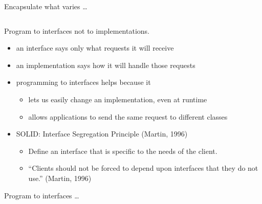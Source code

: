 \documentclass{beamer}
\begin{document}
\begin{frame}{Encapsulate what varies \ldots}
    \begin{columns}
        \column{\dimexpr\paperwidth-40pt}
        
    \end{columns}
\end{frame}

\begin{frame}{Program to interfaces not to implementations.}
    \begin{itemize}
        \item an interface says only what requests it will receive
        \item an implementation says how it will handle those requests
        \item programming to interfaces helps because it
            \begin{itemize}
                \item lets us easily change an implementation, even at runtime
                \item allows applications to send the same request to different classes
            \end{itemize}
        \item SOLID: Interface Segregation Principle (Martin, 1996)
            \begin{itemize}
                \item Define an interface that is specific to the needs of the client.
                \item ``Clients should not be forced to depend upon interfaces that they do not use.'' (Martin, 1996)
            \end{itemize}
    \end{itemize}
\end{frame}

\begin{frame}{Program to interfaces \ldots}
    \begin{columns}
        \column{\dimexpr\paperwidth-40pt}
        
    \end{columns}
\end{frame}
\end{document}
